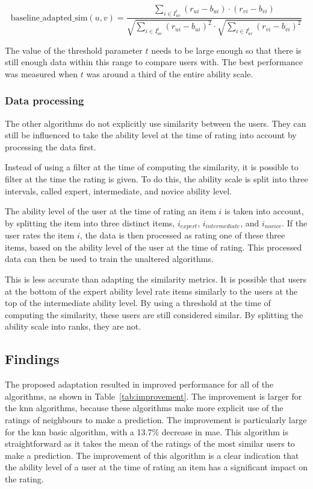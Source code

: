 \begin{equation}
  \label{eq:baseline-adapted}
        \text{baseline\_adapted\_sim}(u, v) = \frac{
            \sum\limits_{i \in I_{uv}^t} (r_{ui} -  b_{ui}) \cdot (r_{vi} -
            b_{vi})} {\sqrt{\sum\limits_{i \in I_{uv}^t} (r_{ui} -  b_{ui})^2}
            \cdot \sqrt{\sum\limits_{i \in I_{uv}^t} (r_{vi} -  b_{vi})^2}}
\end{equation}

The value of the threshold parameter $t$ needs to be large enough so that there is still enough data within this range to compare users with.
The best performance was measured when $t$ was around a third of the entire ability scale.

\subsubsection{Data processing}
The other algorithms do not explicitly use similarity between the users.
They can still be influenced to take the ability level at the time of rating into account by processing the data first.

Instead of using a filter at the time of computing the similarity, it is possible to filter at the time the rating is given.
To do this, the ability scale is split into three intervals, called expert, intermediate, and novice ability level.

The ability level of the user at the time of rating an item $i$ is taken into account, by splitting the item into three distinct items, $i_{expert}$, $i_{intermediate}$, and $i_{novice}$.
If the user rates the item $i$, the data is then processed as rating one of these three items, based on the ability level of the user at the time of rating.
This processed data can then be used to train the unaltered algorithms.

This is less accurate than adapting the similarity metrics. It is possible that users at the bottom of the expert ability level rate items similarly to the users at the top of the intermediate ability level. 
By using a threshold at the time of computing the similarity, these users are still considered similar.
By splitting the ability scale into ranks, they are not.

\subsection{Findings}
The proposed adaptation resulted in improved performance for all of the algorithms, as shown in Table~\ref{tab:improvement}.
The improvement is larger for the \gls{knn} algorithms, because these algorithms make more explicit use of the ratings of neighbours to make a prediction.
The improvement is particularly large for the \gls{knn} basic algorithm, with a 13.7\% decrease in \gls{mae}.
This algorithm is straightforward as it takes the mean of the ratings of the most similar users to make a prediction.
The improvement of this algorithm is a clear indication that the ability level of a user at the time of rating an item has a significant impact on the rating.

